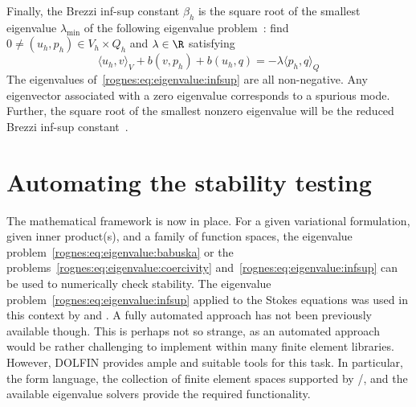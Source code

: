 Finally, the Brezzi inf-sup constant $\beta_h$ is the square root of
the smallest eigenvalue $\lambda_{\min}$ of the following eigenvalue
problem~\citep{Malkus1981, Qin1994}: find $0 \not = (u_h, p_h) \in V_h
\times Q_h$ and $\lambda \in \R$ satisfying
\begin{equation}
  \label{rognes:eq:eigenvalue:infsup}
  \langle u_h, v \rangle_{V} + b(v, p_h) + b(u_h, q) = - \lambda
  \langle p_h, q \rangle_{Q}
\end{equation}
The eigenvalues of~\eqref{rognes:eq:eigenvalue:infsup} are all
non-negative. Any eigenvector associated with a zero eigenvalue
corresponds to a spurious mode. Further, the square root of the
smallest nonzero eigenvalue will be the reduced Brezzi inf-sup
constant~\citep{Qin1994}.

\section{Automating the stability testing}
\label{rognes:sec:automation}

The mathematical framework is now in place. For a given variational
formulation, given inner product(s), and a family of function spaces,
the eigenvalue problem~\eqref{rognes:eq:eigenvalue:babuska} or the
problems~\eqref{rognes:eq:eigenvalue:coercivity}
and~\eqref{rognes:eq:eigenvalue:infsup} can be used to numerically
check stability. The eigenvalue
problem~\eqref{rognes:eq:eigenvalue:infsup} applied to the Stokes
equations was used in this context by
\citet{Qin1994} and \citet{ChapelleBathe1993}. A fully automated approach
has not been previously available though. This is perhaps not so strange,
as an automated approach would be rather challenging to implement within
many finite element libraries. However, DOLFIN provides ample and
suitable tools for this task. In particular, the \ufl{} form language,
the collection of finite element spaces supported by \fiat{}/\ffc{}, and
the available \slepc{} eigenvalue solvers provide the required functionality.

